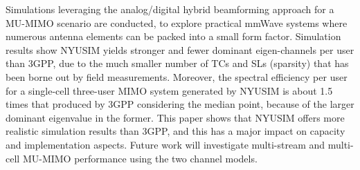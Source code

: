 \documentclass[journal]{IEEEtran}
\begin{document}
Simulations leveraging the analog/digital hybrid beamforming approach for a MU-MIMO scenario are conducted, to explore practical mmWave systems where numerous antenna elements can be packed into a small form factor. Simulation results show NYUSIM yields stronger and fewer dominant eigen-channels per user than 3GPP, due to the much smaller number of TCs and SLs (sparsity) that has been borne out by field measurements. Moreover, the spectral efficiency per user for a single-cell three-user MIMO system generated by NYUSIM is about 1.5 times that produced by 3GPP considering the median point, because of the larger dominant eigenvalue in the former. This paper shows that NYUSIM offers more realistic simulation results  than 3GPP,  and this has a major impact on capacity and implementation aspects. Future work will investigate multi-stream and multi-cell MU-MIMO performance using the two channel models.


\ifCLASSOPTIONcaptionsoff
  \newpage
\fi




\end{document}
